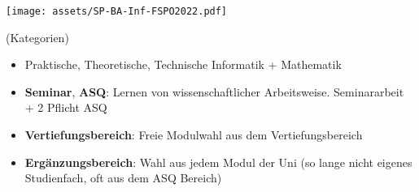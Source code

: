 \documentclass[
	aspectratio=169, 
	10pt 
]{beamer}
\begin{document}
\begin{frame}{\insertsubsection}
    \texttt{[image: assets/SP-BA-Inf-FSPO2022.pdf]}
\end{frame}

\begin{frame}{\insertsubsection\space(Kategorien)}
    \begin{itemize}
        \item Praktische, Theoretische, Technische Informatik + Mathematik
        \item \textbf{Seminar}, \textbf{ASQ}: Lernen von wissenschaftlicher Arbeitsweise. Seminararbeit + 2 Pflicht ASQ
        \item \textbf{Vertiefungsbereich}: Freie Modulwahl aus dem Vertiefungsbereich 
        \item \textbf{Ergänzungsbereich}: Wahl aus jedem Modul der Uni (so lange nicht eigenes Studienfach, oft aus dem ASQ Bereich)
    \end{itemize}
\end{frame}
\end{document}
